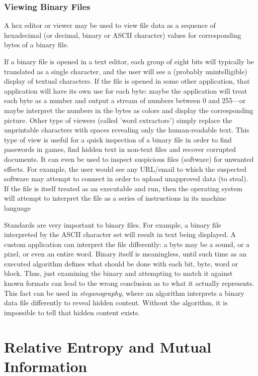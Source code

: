 \documentclass{article}
\begin{document}
  \subsubsection{Viewing Binary Files}
  A hex editor or viewer may be used to view file data as a sequence of hexadecimal (or decimal, binary or ASCII character) values for corresponding bytes of a binary file. 

  If a binary file is opened in a text editor, each group of eight bits will typically be translated as a single character, and the user will see a (probably unintelligible) display of textual characters. If the file is opened in some other application, that application will have its own use for each byte: maybe the application will treat each byte as a number and output a stream of numbers between 0 and 255—or maybe interpret the numbers in the bytes as colors and display the corresponding picture. Other type of viewers (called 'word extractors') simply replace the unprintable characters with spaces revealing only the human-readable text. This type of view is useful for a quick inspection of a binary file in order to find passwords in games, find hidden text in non-text files and recover corrupted documents. It can even be used to inspect suspicious files (software) for unwanted effects. For example, the user would see any URL/email to which the suspected software may attempt to connect in order to upload unapproved data (to steal). If the file is itself treated as an executable and run, then the operating system will attempt to interpret the file as a series of instructions in its machine language

  Standards are very important to binary files. For example, a binary file interpreted by the ASCII character set will result in text being displayed. A custom application can interpret the file differently: a byte may be a sound, or a pixel, or even an entire word. Binary itself is meaningless, until such time as an executed algorithm defines what should be done with each bit, byte, word or block. Thus, just examining the binary and attempting to match it against known formats can lead to the wrong conclusion as to what it actually represents. This fact can be used in \textit{steganography}, where an algorithm interprets a binary data file differently to reveal hidden content. Without the algorithm, it is impossible to tell that hidden content exists.

\section{Relative Entropy and Mutual Information}
\end{document}
